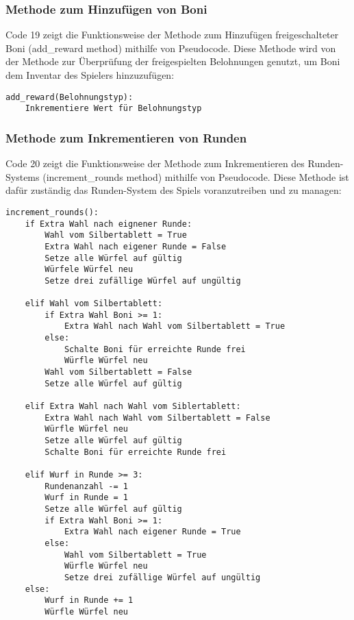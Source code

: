 \subsubsection{Methode zum Hinzufügen von Boni}
\begin{minipage}{\linewidth}
Code 19 zeigt die Funktionsweise der Methode zum Hinzufügen freigeschalteter Boni (add\_reward method) mithilfe von Pseudocode. Diese Methode wird von der Methode zur Überprüfung der freigespielten Belohnungen genutzt, um Boni dem Inventar des Spielers hinzuzufügen:
\vspace{0.5cm}
\begin{lstlisting}[caption={Methode zum Hinzufügen freigschalteter Boni}]
add_reward(Belohnungstyp):
	Inkrementiere Wert für Belohnungstyp
\end{lstlisting}
\end{minipage}

\subsubsection{Methode zum Inkrementieren von Runden}
Code 20 zeigt die Funktionsweise der Methode zum Inkrementieren des Runden-Systems (increment\_rounds method) mithilfe von Pseudocode. Diese Methode ist dafür zuständig das Runden-System des Spiels voranzutreiben und zu managen:
\vspace{0.5cm}
\begin{lstlisting}[caption={Methode zum Inkrementieren des Runden-Systems}]
increment_rounds():
	if Extra Wahl nach eignener Runde:
		Wahl vom Silbertablett = True
		Extra Wahl nach eigener Runde = False
		Setze alle Würfel auf gültig
		Würfele Würfel neu
		Setze drei zufällige Würfel auf ungültig
		
	elif Wahl vom Silbertablett:
		if Extra Wahl Boni >= 1:
			Extra Wahl nach Wahl vom Silbertablett = True
		else:
			Schalte Boni für erreichte Runde frei
			Würfle Würfel neu
		Wahl vom Silbertablett = False
		Setze alle Würfel auf gültig
	
	elif Extra Wahl nach Wahl vom Siblertablett:
		Extra Wahl nach Wahl vom Silbertablett = False
		Würfle Würfel neu
		Setze alle Würfel auf gültig
		Schalte Boni für erreichte Runde frei
	
	elif Wurf in Runde >= 3:
		Rundenanzahl -= 1
		Wurf in Runde = 1
		Setze alle Würfel auf gültig
		if Extra Wahl Boni >= 1:
			Extra Wahl nach eigener Runde = True
		else:
			Wahl vom Silbertablett = True
			Würfle Würfel neu
			Setze drei zufällige Würfel auf ungültig
	else:
		Wurf in Runde += 1
		Würfle Würfel neu
\end{lstlisting}
